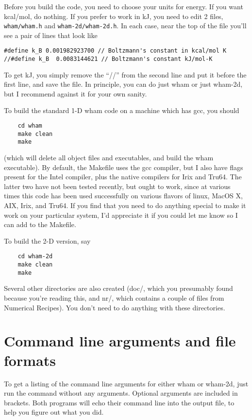\documentclass[12pt]{article}
\begin{document}
Before you build the code, you need to choose your units for energy.  If you
want kcal/mol, do nothing.  If you prefer to work in kJ, you need to edit
2 files, {\tt wham/wham.h} and {\tt wham-2d/wham-2d.h}.  In each case, near the
top of the file you'll see a pair of lines that look like 

\begin{verbatim}
#define k_B 0.001982923700 // Boltzmann's constant in kcal/mol K
//#define k_B  0.0083144621 // Boltzmann's constant kJ/mol-K
\end{verbatim}

To get kJ, you simply remove the ``//'' from the second line and put it
before the first line, and save the file.  In principle, you can do just wham
or just wham-2d, but I recommend against it for your own sanity.  

To build the standard 1-D wham code on a machine which has gcc, you should

\begin{verbatim}
    cd wham
    make clean
    make
\end{verbatim}

(which will delete all object files and executables, and build the wham
executable).  By default, the Makefile uses the gcc compiler, but I also have
flags present for the Intel compiler, plus the native compilers for Irix and
Tru64.  The latter two have not been tested recently, but ought to work,
since at various times this code has been used successfully on various
flavors of linux, MacOS X, AIX, Irix, and Tru64.  If you find that you need
to do anything special to make it work on your particular system, I'd
appreciate it if you could let me know so I can add to the Makefile.

To build the 2-D version,  say

\begin{verbatim}
    cd wham-2d
    make clean
    make
\end{verbatim}

Several other directories are also created (doc/, which you presumably found
because you're reading this, and nr/, which contains a couple of files from
Numerical Recipes).  You don't need to do anything with these directories.

\section{Command line arguments and file formats}

To get a listing of the command line arguments for either wham or wham-2d,
just run the command without any arguments.  Optional arguments are
included in brackets.  Both programs will echo their command line into the
output file, to help you figure out what you did.
\end{document}
